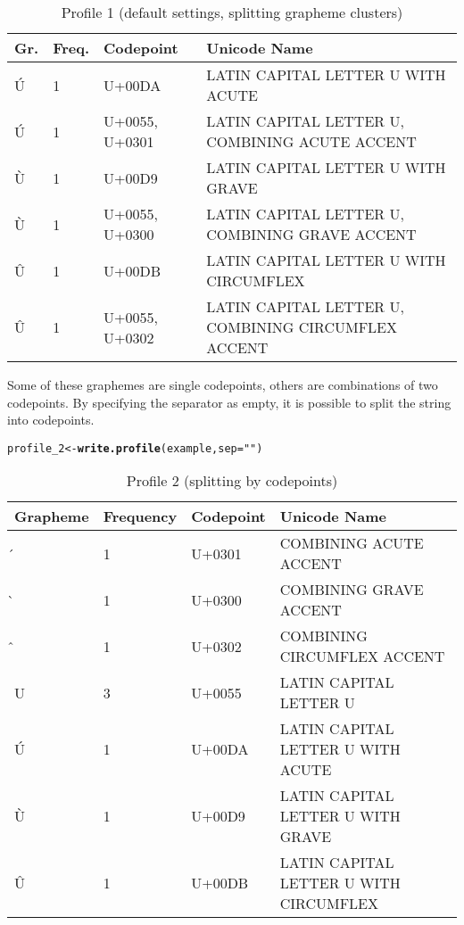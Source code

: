 \documentclass[output=inprep,
		biblatex
		]{LSP/langsci}\usepackage[]{graphicx}\usepackage[]{color}
\makeatletter
\newcommand{\hlstr}[1]{\textcolor[rgb]{0.192,0.494,0.8}{#1}}%
\newcommand{\hlstd}[1]{\textcolor[rgb]{0.345,0.345,0.345}{#1}}%
\newcommand{\hlkwb}[1]{\textcolor[rgb]{0.69,0.353,0.396}{#1}}%
\newcommand{\hlkwc}[1]{\textcolor[rgb]{0.333,0.667,0.333}{#1}}%
\newcommand{\hlkwd}[1]{\textcolor[rgb]{0.737,0.353,0.396}{\textbf{#1}}}%
\newenvironment{kframe}{%
 \def\at@end@of@kframe{}%
 \ifinner\ifhmode%
  \def\at@end@of@kframe{\end{minipage}}%
  \begin{minipage}{\columnwidth}%
 \fi\fi%
 \def\FrameCommand##1{\hskip\@totalleftmargin \hskip-\fboxsep
 \colorbox{shadecolor}{##1}\hskip-\fboxsep
     \hskip-\linewidth \hskip-\@totalleftmargin \hskip\columnwidth}%
 \MakeFramed {\advance\hsize-\width
   \@totalleftmargin\z@ \linewidth\hsize
   \@setminipage}}%
 {\par\unskip\endMakeFramed%
 \at@end@of@kframe}
\newenvironment{knitrout}{}{} %
\makeatother
\begin{document}
\begin{table}[H]
\centering
\begingroup\scriptsize
\begin{tabular}{llll}
  \toprule
Gr. & Freq. & Codepoint & Unicode Name \\ 
  \midrule
Ú & 1 & U+00DA & LATIN CAPITAL LETTER U WITH ACUTE \\ 
  Ú & 1 & U+0055, U+0301 & LATIN CAPITAL LETTER U, COMBINING ACUTE ACCENT \\ 
  Ù & 1 & U+00D9 & LATIN CAPITAL LETTER U WITH GRAVE \\ 
  Ù & 1 & U+0055, U+0300 & LATIN CAPITAL LETTER U, COMBINING GRAVE ACCENT \\ 
  Û & 1 & U+00DB & LATIN CAPITAL LETTER U WITH CIRCUMFLEX \\ 
  Û & 1 & U+0055, U+0302 & LATIN CAPITAL LETTER U, COMBINING CIRCUMFLEX ACCENT \\ 
   \bottomrule
\end{tabular}
\endgroup
\caption{Profile 1 (default settings, splitting grapheme clusters)} 
\label{tab:profile1}
\end{table}


\noindent Some of these graphemes are single codepoints, others are combinations
of two codepoints. By specifying the separator as empty, it is possible to split
the string into codepoints.

\begin{knitrout}\footnotesize
{}\color{fgcolor}\begin{kframe}
\begin{alltt}
\hlstd{profile_2} \hlkwb{<-} \hlkwd{write.profile}\hlstd{(example,} \hlkwc{sep} \hlstd{=} \hlstr{""}\hlstd{)}
\end{alltt}
\end{kframe}
\end{knitrout}

\begin{table}[H]
\centering
\begingroup\scriptsize
\begin{tabular}{llll}
  \toprule
Grapheme & Frequency & Codepoint & Unicode Name \\ 
  \midrule
́ & 1 & U+0301 & COMBINING ACUTE ACCENT \\ 
  ̀ & 1 & U+0300 & COMBINING GRAVE ACCENT \\ 
  ̂ & 1 & U+0302 & COMBINING CIRCUMFLEX ACCENT \\ 
  U & 3 & U+0055 & LATIN CAPITAL LETTER U \\ 
  Ú & 1 & U+00DA & LATIN CAPITAL LETTER U WITH ACUTE \\ 
  Ù & 1 & U+00D9 & LATIN CAPITAL LETTER U WITH GRAVE \\ 
  Û & 1 & U+00DB & LATIN CAPITAL LETTER U WITH CIRCUMFLEX \\ 
   \bottomrule
\end{tabular}
\endgroup
\caption{Profile 2 (splitting by codepoints)} 
\label{tab:profile2}
\end{table}
\end{document}
